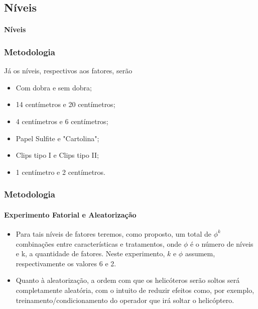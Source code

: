 \documentclass{beamer}
\begin{document}
   \subsection{Níveis}
            \begin{frame}
                \framesubtitle{Níveis}
                    \frametitle{Metodologia}

                        Já os níveis, respectivos aos fatores, serão
                            \begin{itemize}
                                \item Com dobra e sem dobra;
                                \item 14 centímetros e 20 centímetros;
                                \item 4 centímetros e 6 centímetros;
                                \item Papel Sulfite e "Cartolina";
                                \item Clips tipo I e Clips tipo II;
                                \item 1 centímetro e 2 centímetros.
                            \end{itemize}
            \end{frame}

            \begin{frame}
                  \frametitle{Metodologia}
                     \framesubtitle{Experimento Fatorial e Aleatorização}
                        \begin{itemize}
                           \item Para tais níveis de fatores teremos, como proposto, um total de $\phi^k$ combinações entre características e tratamentos, onde $\phi$ é o número de níveis e k, a quantidade de fatores. Neste experimento, $k$ e $\phi$ assumem, respectivamente os valores 6 e 2.

                           \item Quanto à aleatorização, a ordem com que os helicóteros serão soltos será completamente aleatória, com o intuito de reduzir efeitos como, por exemplo, treinamento/condicionamento do operador que irá soltar o helicóptero.

                        \end{itemize}
            \end{frame}
\end{document}
